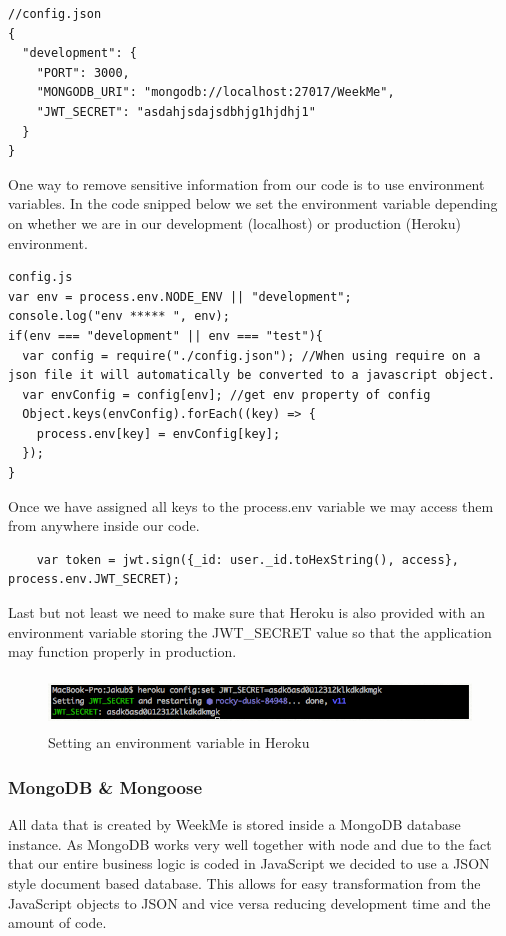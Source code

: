 \begin{lstlisting}
//config.json 
{
  "development": {
    "PORT": 3000, 
    "MONGODB_URI": "mongodb://localhost:27017/WeekMe",
    "JWT_SECRET": "asdahjsdajsdbhjg1hjdhj1"
  }
} 
\end{lstlisting}


One way to remove sensitive information from our code is to use environment variables. 
In the code snipped below we set the environment variable depending on whether we are in our development (localhost) or production (Heroku) environment. 

\begin{lstlisting}
config.js
var env = process.env.NODE_ENV || "development";  
console.log("env ***** ", env);
if(env === "development" || env === "test"){
  var config = require("./config.json"); //When using require on a json file it will automatically be converted to a javascript object.
  var envConfig = config[env]; //get env property of config
  Object.keys(envConfig).forEach((key) => {
    process.env[key] = envConfig[key];
  });
}
\end{lstlisting}
 
Once we have assigned all keys to the process.env variable we may access them from anywhere inside our code. 

\begin{lstlisting}
	var token = jwt.sign({_id: user._id.toHexString(), access}, process.env.JWT_SECRET);
\end{lstlisting}

Last but not least we need to make sure that Heroku is also provided with an environment variable storing the JWT\_SECRET value so that the application may function properly in production.  

	\begin{figure}[H] 
		\centering 
		\includegraphics[height=1.4cm]{figures/herokuenvironmentvar}    
		\caption[Setting an environment variable in Heroku]{Setting an environment variable in Heroku}     
		\label{fig: Setting an environment variable in Heroku}     
	\end{figure}  


\subsubsection{MongoDB \& Mongoose} 
All data that is created by WeekMe is stored inside a MongoDB database instance. As MongoDB works very well together with node and due to the fact that our entire business logic is coded in JavaScript we decided to use a JSON style document based database. This allows for easy transformation from the JavaScript objects to JSON and vice versa reducing development time and the amount of code.  
  

